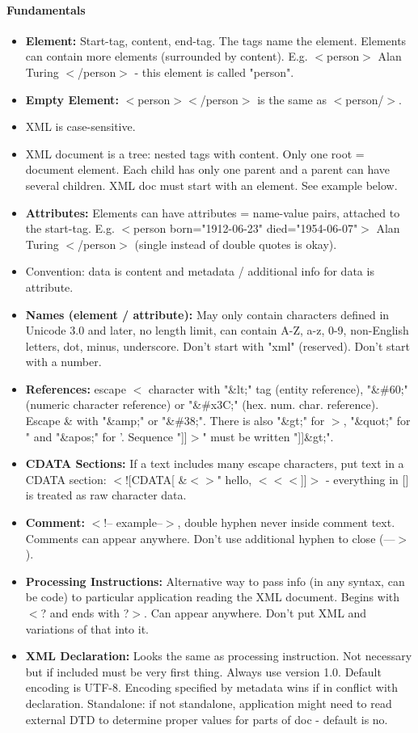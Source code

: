 \paragraph{Fundamentals}
\begin{itemize}
    \item \textbf{Element:} Start-tag, content, end-tag. The tags name the element. Elements can contain more elements (surrounded by content). E.g.  $<$person$>$ Alan Turing $<$/person$>$ - this element is called "person".
    \item \textbf{Empty Element:} $<$person$><$/person$>$ is the same as $<$person/$>$.
    \item XML is case-sensitive.
    \item XML document is a tree: nested tags with content. Only one root = document element. Each child has only one parent and a parent can have several children. XML doc must start with an element. See example below.
    \item \textbf{Attributes:} Elements can have attributes = name-value pairs, attached to the start-tag. E.g. $<$person born="1912-06-23" died="1954-06-07"$>$ Alan Turing $<$/person$>$ (single instead of double quotes is okay).
    \item Convention: data is content and metadata / additional info for data is attribute.
    \item \textbf{Names (element / attribute):} May only contain characters defined in Unicode 3.0 and later, no length limit, can contain A-Z, a-z, 0-9, non-English letters, dot, minus, underscore. Don't start with "xml" (reserved). Don't start with a number. %
    \item \textbf{References:} escape $<$ character with "\&lt;" tag (entity reference), "\&\#60;" (numeric character reference) or "\&\#x3C;" (hex. num. char. reference). Escape \& with "\&amp;" or "\&\#38;". There is also "\&gt;" for $>$, "\&quot;" for " and "\&apos;" for '. Sequence "]]$>$" must be written "]]\&gt;". %
    \item \textbf{CDATA Sections:} If a text includes many escape characters, put text in a CDATA section: $<$![CDATA[ \&$<>$" hello, $<<<$]]$>$ - everything in [] is treated as raw character data.
    \item \textbf{Comment:} $<$!-- example--$>$, double hyphen never inside comment text. Comments can appear anywhere. Don't use additional hyphen to close (---$>$).
    \item \textbf{Processing Instructions:} Alternative way to pass info (in any syntax, can be code) to particular application reading the XML document. Begins with $<$? and ends with ?$>$. Can appear anywhere. Don't put XML and variations of that into it. %
    \item \textbf{XML Declaration:} Looks the same as processing instruction. Not necessary but if included must be very first thing. Always use version 1.0. Default encoding is UTF-8. Encoding specified by metadata wins if in conflict with declaration. Standalone: if not standalone, application might need to read external DTD to determine proper values for parts of doc - default is no.
\end{itemize}


